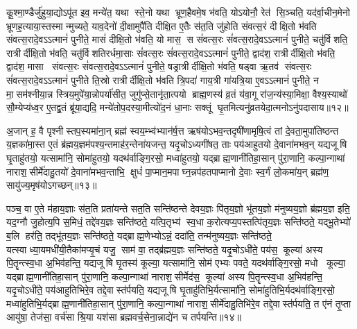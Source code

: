 कू॒श्मा॒ण्डैर्जु॑हुया॒द्योऽपू॑त इव॒ मन्ये॑त॒ यथा स्ते॒नो यथा भ्रूण॒हैवमे॒ष भ॑वति॒ योऽयोनौ॒ रेत॑ सि॒ञ्चति॒ यद॑र्वा॒चीन॒मेनो भ्रूणह॒त्याया॒स्तस्मान्मुच्यते॒ याव॒देनो॑ दी॒क्षामुपै॑ति दीक्षि॒त ए॒तैः स॑त॒ति जु॑होति संवत्स॒रं दीक्षि॒तो भ॑वति संवत्स॒रादे॒वऽऽत्मानं॑ पुनीते॒ मासं॑ दीक्षि॒तो भ॑वति॒ यो मास॒ स सं॑वत्स॒रः सं॑वत्स॒रादे॒वऽऽत्मानं॑ पुनीते॒ चतु॑र्विशति॒ रात्रीर्दीक्षि॒तो भ॑वति॒ चतु॑र्विशतिरर्धमा॒साः सं॑वत्स॒रः सं॑वत्स॒रादे॒वऽऽत्मानं॑ पुनीते॒ द्वाद॑श॒ रात्रीर्दीक्षि॒तो भ॑वति॒ द्वाद॑श॒ मासा संवत्स॒रः सं॑वत्स॒रादे॒वऽऽत्मानं॑ पुनीते॒ षड्रात्रीर्दीक्षि॒तो भ॑वति॒ षड्वा ऋ॒तव॑ संवत्स॒रः सं॑वत्स॒रादे॒वऽऽत्मानं॑ पुनीते ति॒स्रो रात्रीर्दीक्षि॒तो भ॑वति त्रि॒पदा॑ गाय॒त्री गा॑यत्रि॒या ए॒वऽऽत्मानं॑ पुनीते॒ न मा॒सम॑श्नीया॒न्न स्त्रिय॒मुपे॑या॒न्नोपर्या॑सीत॒ जुगु॑प्से॒तानृ॑ता॒त्पयो ब्राह्म॒णस्य॑ व्र॒तं य॑वा॒गू रा॑ज॒न्य॑स्या॒मिक्षा॒ वैश्य॒स्याथो॑ सौ॒म्येप्य॑ध्व॒र ए॒तद्व्र॒तं ब्रू॑या॒द्यदि॒ मन्ये॑तोप॒दस्या॒मीत्यो॑द॒नं धा॒नाः सक्तूं घृ॒तमित्यनु॑व्रतयेदा॒त्मनोऽनु॑पदासाय॥१२॥ 
\anuvakamend


अ॒जान् ह॒ वै पृश्नीस्तप॒स्यमा॑ना॒न् ब्रह्म॑ स्वय॒म्भ्व॑भ्यान॑र्\mbox{}ष॒त्त ऋष॑योऽभव॒न्तदृषी॑णामृषि॒त्वं तां दे॒वता॒मुपा॑तिष्ठन्त य॒ज्ञका॑मा॒स्त ए॒तं ब्र॑ह्मय॒ज्ञम॑पश्य॒न्तमाह॑र॒न्तेना॑यजन्त॒ यदृ॒चोऽध्यगी॑षत॒ ताः पय॑आहुतयो दे॒वाना॑मभव॒न् यद्यजूषि घृ॒ताहु॑तयो॒ यत्सामा॑नि॒ सोमा॑हुतयो॒ यदथ॑र्वाङ्गि॒रसो॒ मध्वा॑हुतयो॒ यद्ब्राह्म॒णानी॑तिहा॒सान् पु॑रा॒णानि॒ कल्पा॒न्गाथा॑ नाराश॒सीर्मे॑दाहु॒तयो॑ दे॒वाना॑मभव॒न्ताभि॒ क्षुधं॑ पा॒प्मान॒मपाघ्न॒न्नप॑हतपाप्मानो दे॒वाः स्व॒र्गं लो॒कमा॑य॒न् ब्रह्म॑ण॒ सायु॑ज्य॒मृष॑योऽगच्छन्॥१३॥\anuvakamend

पञ्च॒ वा ए॒ते म॑हाय॒ज्ञाः स॑त॒ति प्रता॑यन्ते सत॒ति सन्ति॑ष्ठन्ते देवय॒ज्ञः पि॑तृय॒ज्ञो भू॑तय॒ज्ञो म॑नुष्यय॒ज्ञो ब्र॑ह्मय॒ज्ञ इति॒ यद॒ग्नौ जु॒होत्य॒पि स॒मिधं॒ तद्दे॑वय॒ज्ञः सन्ति॑ष्ठते॒ यत्पि॒तृभ्य॑ स्व॒धा क॒रोत्यप्य॒पस्तत्पि॑तृय॒ज्ञः सन्ति॑ष्ठते॒ यद्भू॒तेभ्यो॑ ब॒लि हर॑ति॒ तद्भू॑तय॒ज्ञः सन्ति॑ष्ठते॒ यद्ब्राह्म॒णेभ्योऽन्नं॒ ददा॑ति॒ तन्म॑नुष्यय॒ज्ञः सन्ति॑ष्ठते॒ यत्स्वाध्या॒यमधी॑यी॒तैका॑मप्यृ॒चं यजु॒ साम॑ वा॒ तद्ब्र॑ह्मय॒ज्ञः सन्ति॑ष्ठते॒ यदृ॒चोऽधी॑ते॒ पय॑स॒ कूल्या॑ अस्य पि॒तॄन्त्स्व॒धा अ॒भिव॑हन्ति॒ यद्यजूषि घृ॒तस्य॑ कूल्या॒ यत्सामा॑नि॒ सोम॑ एभ्यः पवते॒ यदथ॑र्वाङ्गि॒रसो॒ मधो कूल्या॒ यद्ब्राह्म॒णानी॑तिहा॒सान् पु॑रा॒णानि॒ कल्पा॒न्गाथा॑ नाराश॒सीर्मेद॑स॒ कूल्या॑ अस्य पि॒तॄन्त्स्व॒धा अ॒भिव॑हन्ति॒ यदृ॒चोऽधी॑ते॒ पय॑आहुतिभिरे॒व तद्दे॒वास्त॑र्पयति॒ यद्यजूषि घृ॒ताहु॑तिभि॒र्यत्सामा॑नि॒ सोमा॑हुतिभि॒र्यदथ॑र्वाङ्गि॒रसो॒ मध्वा॑\-हुतिभि॒र्यद्ब्राह्म॒णानी॑तिहा॒सान् पु॑रा॒णानि॒ कल्पा॒न्गाथा॑ नाराश॒सीर्मे॑दाहु॒तिभि॑रे॒व तद्दे॒वास्त॑र्पयति॒ त ए॑नं तृ॒प्ता आयु॑षा॒ तेज॑सा॒ वर्च॑सा श्रि॒या यश॑सा ब्रह्मवर्च॒सेना॒न्नाद्ये॑न च तर्पयन्ति॥१४॥
\anuvakamend


